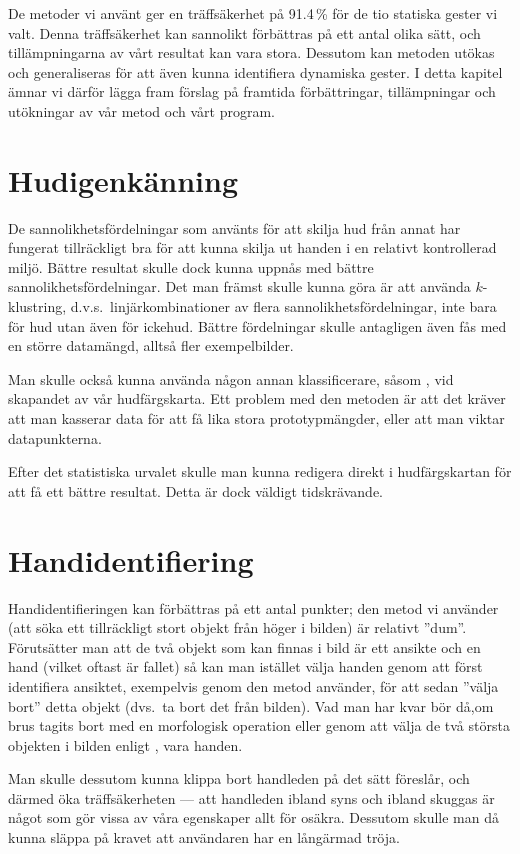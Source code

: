 \documentclass[../rapport_MVEX01-11-05]{subfiles}
\begin{document}
De metoder vi använt ger en träffsäkerhet på 91.4\,\% för de tio statiska
gester vi valt. Denna träffsäkerhet kan sannolikt förbättras på ett antal
olika sätt, och tillämpningarna av vårt resultat kan vara stora. Dessutom
kan metoden utökas och generaliseras för att även kunna identifiera
dynamiska gester. I detta kapitel ämnar vi därför lägga fram förslag på framtida
förbättringar, tillämpningar och utökningar av vår metod och vårt program.

\section{Hudigenkänning}
De sannolikhetsfördelningar som använts för att skilja hud från annat
har fungerat tillräckligt bra för att kunna skilja ut handen i en
relativt kontrollerad miljö. Bättre resultat skulle dock kunna uppnås
med bättre sannolikhetsfördelningar. Det man främst skulle kunna göra
är att använda $k$-klustring, d.v.s.~linjärkombinationer av flera
sannolikhetsfördelningar, inte bara för hud utan även för ickehud. Bättre fördelningar skulle
antagligen även fås med en större datamängd, alltså fler
exempelbilder.

Man skulle också kunna använda någon annan klassificerare, såsom \knn,
vid skapandet av vår hudfärgskarta. Ett problem med den metoden är att det
kräver att man kasserar data för att få lika stora prototypmängder,
eller att man viktar datapunkterna.

Efter det statistiska urvalet skulle man kunna redigera direkt i
hudfärgskartan för att få ett bättre resultat. Detta är dock väldigt
tidskrävande.

\section{Handidentifiering}
Handidentifieringen kan förbättras på ett antal punkter;
den metod vi använder (att söka ett tillräckligt stort objekt från höger i
bilden) är relativt ''dum''. Förutsätter man att de två objekt som kan finnas
i bild är ett ansikte och en hand (vilket oftast är fallet) så kan man
istället välja handen genom att först identifiera ansiktet, exempelvis genom
den metod  använder, för att sedan ''välja bort'' detta
objekt (dvs.~ta bort det från bilden). Vad man har kvar bör då,om brus tagits
bort med en morfologisk operation eller genom att välja de två största
objekten i bilden enligt , vara handen.

Man skulle dessutom kunna klippa bort handleden på det sätt
 föreslår, och därmed öka träffsäkerheten --- att
handleden ibland syns och ibland skuggas är något som gör vissa av våra
egenskaper allt för osäkra. Dessutom skulle man då kunna släppa på kravet
att användaren har en långärmad tröja.
\end{document}
